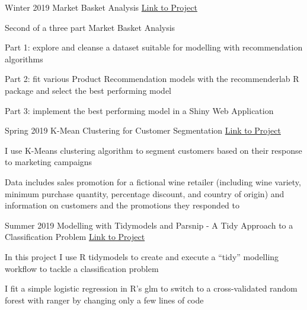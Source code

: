 

\begin{cventries}

  \cventry
    {Winter 2019} %
    {Market Basket Analysis} %
    {\href{https://rpubs.com/DiegoUsai/478772}{Link to Project}} %
    {} %
    {
      \begin{cvitems} %
        \item {Second of a three part Market Basket Analysis}
        \item {Part 1: explore and cleanse a dataset suitable for modelling with recommendation algorithms}
        \item {Part 2: fit various Product Recommendation models with the recommenderlab R package and select the best performing model}
        \item {Part 3: implement the best performing model in a Shiny Web Application}
      \end{cvitems}
    }

  \cventry
    {Spring 2019} %
    {K-Mean Clustering for Customer Segmentation} %
    {\href{https://rpubs.com/DiegoUsai/500245}{Link to Project}} %
    {} %
    {
      \begin{cvitems} %
        \item {I use K-Means clustering algorithm to segment customers based on their response to marketing campaigns}
        \item {Data includes sales promotion for a fictional wine retailer (including wine variety, minimum purchase quantity, percentage discount, and country of origin) and information on customers and the promotions they responded to}
      \end{cvitems}
    }
    
  \cventry
    {Summer 2019} %
    {Modelling with Tidymodels and Parsnip - A Tidy Approach to a Classification Problem} %
    {\href{https://rpubs.com/DiegoUsai/509300}{Link to Project}} %
    {} %
    {
      \begin{cvitems} %
        \item {In this project I use R tidymodels to create and execute a “tidy” modelling workflow to tackle a classification problem}
        \item {I fit a simple logistic regression in R’s glm to switch to a cross-validated random forest with ranger by changing only a few lines of code}
      \end{cvitems}
    }

\end{cventries}
